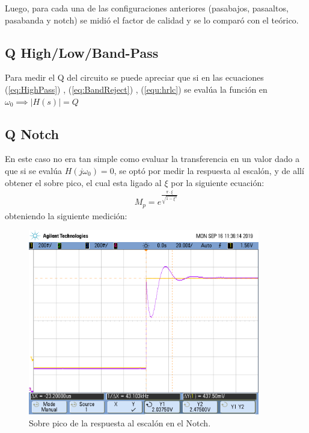 Luego, para cada una de las configuraciones anteriores (pasabajos, pasaaltos, pasabanda y notch) se midió el factor de calidad y se lo comparó con el teórico.
\subsection{Q High/Low/Band-Pass}
Para medir el Q del circuito se puede apreciar que si en las ecuaciones (\ref{eq:HighPass}) , (\ref{eq:BandReject}) , (\ref{equ:hrlc}) se evalúa la función en $\omega_0 \implies |H(s)|=Q$

\subsection{Q Notch}
En este caso no era tan simple como evaluar la transferencia en un valor dado a que si se evalúa $H(j\omega_0)=0$, se optó por medir la respuesta al escalón, y de allí obtener el sobre pico, el cual esta ligado al $\xi$ por la siguiente ecuación:
\begin{align}M_p = e^{\frac{\pi \cdot \xi}{\sqrt{1-\xi^2}}} \end{align}
obteniendo la siguiente medición:
\begin{figure}[H]
	\centering
	\includegraphics[width=0.9\textwidth]{Mediciones_pendrive_alan/scope_1.png}
\caption{Sobre pico de la respuesta al escalón en el Notch.}
	\label{fig:Overshoot5}
\end{figure}


